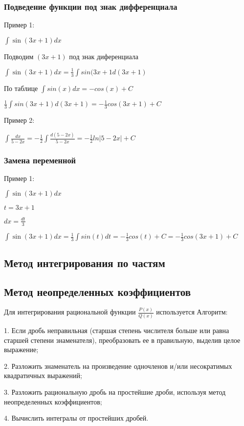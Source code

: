 \documentclass[12pt,a4paper]{article}
\begin{document}
\subsubsection{Подведение функции под знак дифференциала}

Пример 1: 

$ \int{\sin(3x + 1)dx} $ 

Подводим $ (3x+1) $ под знак диференциала 

$ \int{\sin(3x + 1)dx} = \frac{1}{3}\int{sin(3x+1}d(3x+1) $ 

По таблице $ \int{sin(x)dx} = -cos(x) + C $ 

$ \frac{1}{3}\int{sin(3x+1)d(3x+1)} = -\frac{1}{3}cos(3x+1) + C $

Пример 2: 

$ \int{\frac{dx}{5 - 2x}} = -\frac{1}{2}\int{\frac{d(5-2x)}{5 - 2x}}
= -\frac{1}{2}ln|5-2x|+C $

\subsubsection{Замена переменной}
Пример 1: 

$ \int{\sin(3x + 1)dx} $ 

$ t = 3x + 1 $ 

$ dx = \frac{dt}{3} $ 

$ \int{\sin(3x + 1)dx} = \frac{1}{3}\int{sin(t)dt} = -\frac{1}{3}cos(t) + C = -\frac{1}{3}cos(3x+1) + C $ 

\subsection{Метод интегрирования по частям}


\subsection{Метод неопределенных коэффициентов}
Для интегрирования рациональной функции $\frac{P(x)}{Q(x)}$ используется Алгоритм:

1. Если дробь неправильная (старшая степень числителя больше или равна старшей степени знаменателя), преобразовать ее в правильную, выделив целое выражение; 

2. Разложить знаменатель на произведение одночленов и/или несократимых квадратичных выражений; 

3. Разложить рациональную дробь на простейшие дроби, используя метод неопределенных коэффициентов; 

4. Вычислить интегралы от простейших дробей. 
\end{document}
